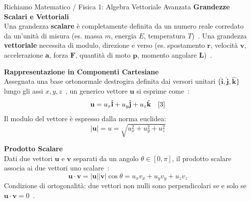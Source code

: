 \documentclass[12pt, a4paper]{article}
\begin{document}
\begin{boxrichiamo}{Richiamo Matematico / Fisica 1: Algebra Vettoriale Avanzata}
\textbf{Grandezze Scalari e Vettoriali} \\
Una grandezza \textbf{scalare} è completamente definita da un numero reale corredato da un'unità di misura (es. massa $m$, energia $E$, temperatura $T$)~\cite{3}. Una grandezza \textbf{vettoriale} necessita di modulo, direzione e verso (es. spostamento $\mathbf{r}$, velocità $\mathbf{v}$, accelerazione $\mathbf{a}$, forza $\mathbf{F}$, quantità di moto $\mathbf{p}$, momento angolare $\mathbf{L}$)~\cite{3}.

\vspace{0.3cm}
\textbf{Rappresentazione in Componenti Cartesiane} \\
Assegnata una base ortonormale destrogira definita dai versori unitari $\{\hat{\mathbf{i}}, \hat{\mathbf{j}}, \hat{\mathbf{k}}\}$ lungo gli assi $x, y, z$~\cite{3}, un generico vettore $\mathbf{u}$ si esprime come~\cite{3}:
\[
\mathbf{u} = u_x \hat{\mathbf{i}} + u_y \hat{\mathbf{j}} + u_z \hat{\mathbf{k}} \quad \text{\cite{3}}
\]
Il modulo del vettore è espresso dalla norma euclidea:
\[
|\mathbf{u}| = u = \sqrt{u_x^2 + u_y^2 + u_z^2}
\]

\vspace{0.3cm}
\textbf{Prodotto Scalare} \\
Dati due vettori $\mathbf{u}$ e $\mathbf{v}$ separati da un angolo $\theta \in [0, \pi]$, il prodotto scalare associa ai due vettori uno scalare~\cite{1}:
\[
\mathbf{u} \cdot \mathbf{v} = |\mathbf{u}| |\mathbf{v}| \cos\theta = u_x v_x + u_y v_y + u_z v_z
\]
Condizione di ortogonalità: due vettori non nulli sono perpendicolari se e solo se $\mathbf{u} \cdot \mathbf{v} = 0$~\cite{1}.
\end{boxrichiamo}

\vspace{0.5cm}
\end{document}
